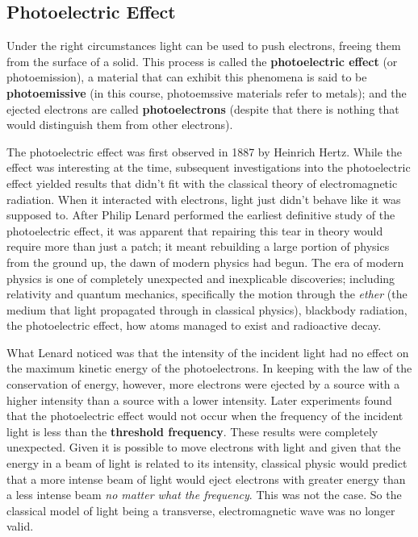 \subsection{Photoelectric Effect}

Under the right circumstances light can be used to push electrons, freeing them from the surface of a solid. This process is called the \textbf{photoelectric effect} (or photoemission), a material that can exhibit this phenomena is said to be \textbf{photoemissive} (in this course, photoemssive materials refer to metals); and the ejected electrons are called \textbf{photoelectrons} (despite that there is nothing that would distinguish them from other electrons).

The photoelectric effect was first observed in 1887 by Heinrich Hertz. While the effect was interesting at the time, subsequent investigations into the photoelectric effect yielded results that didn't fit with the classical theory of electromagnetic radiation. When it interacted with electrons, light just didn't behave like it was supposed to. After Philip Lenard performed the earliest definitive study of the photoelectric effect, it was apparent that repairing this tear in theory would require more than just a patch; it meant rebuilding a large portion of physics from the ground up, the dawn of modern physics had begun. The era of modern physics is one of completely unexpected and inexplicable discoveries; including relativity and quantum mechanics, specifically the motion through the \textit{ether} (the medium that light propagated through in classical physics), blackbody radiation, the photoelectric effect, how atoms managed to exist and radioactive decay.  

What Lenard noticed was that the intensity of the incident light had no effect on the maximum kinetic energy of the photoelectrons. In keeping with the law of the conservation of energy, however, more electrons were ejected by a source with a higher intensity than a source with a lower intensity. Later experiments found that the photoelectric effect would not occur when the frequency of the incident light is less than the \textbf{threshold frequency}.  These results were completely unexpected. Given it is possible to move electrons with light and given that the energy in a beam of light is related to its intensity, classical physic would predict that a more intense beam of light would eject electrons with greater energy than a less intense beam \textit{no matter what the frequency}. This was not the case. So the classical model of light being a transverse, electromagnetic wave was no longer valid. 

